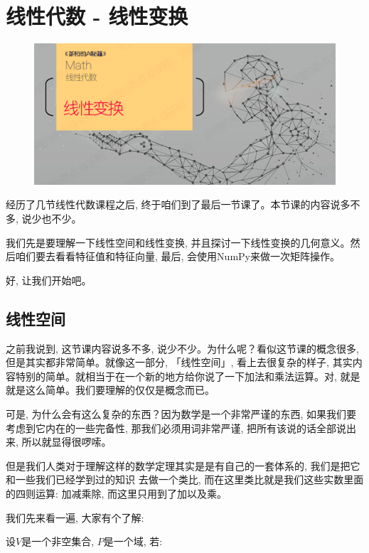 \chapter{线性代数 - 线性变换}

\begin{figure}[ht]
  \centering
  \includegraphics[width=1\linewidth]{asset/20230913175040.png}
\end{figure}

\newpage

经历了几节线性代数课程之后, 终于咱们到了最后一节课了。本节课的内容说多不多, 说少也不少。

我们先是要理解一下线性空间和线性变换, 并且探讨一下线性变换的几何意义。然后咱们要去看看特征值和特征向量, 最后, 会使用NumPy来做一次矩阵操作。

好, 让我们开始吧。

\section{线性空间}

之前我说到, 这节课内容说多不多, 说少不少。为什么呢？看似这节课的概念很多, 但是其实都非常简单。就像这一部分, 「线性空间」,  看上去很复杂的样子, 其实内容特别的简单。就相当于在一个新的地方给你说了一下加法和乘法运算。对, 就是就是这么简单。我们要理解的仅仅是概念而已。

可是, 为什么会有这么复杂的东西？因为数学是一个非常严谨的东西, 如果我们要考虑到它内在的一些完备性, 那我们必须用词非常严谨, 把所有该说的话全部说出来, 所以就显得很啰嗦。

但是我们人类对于理解这样的数学定理其实是是有自己的一套体系的, 我们是把它和一些我们已经学到过的知识
去做一个类比, 而在这里类比就是我们这些实数里面的四则运算: 加减乘除, 而这里只用到了加以及乘。


我们先来看一遍, 大家有个了解: 

设$V$是一个非空集合, $P$是一个域, 若: 

